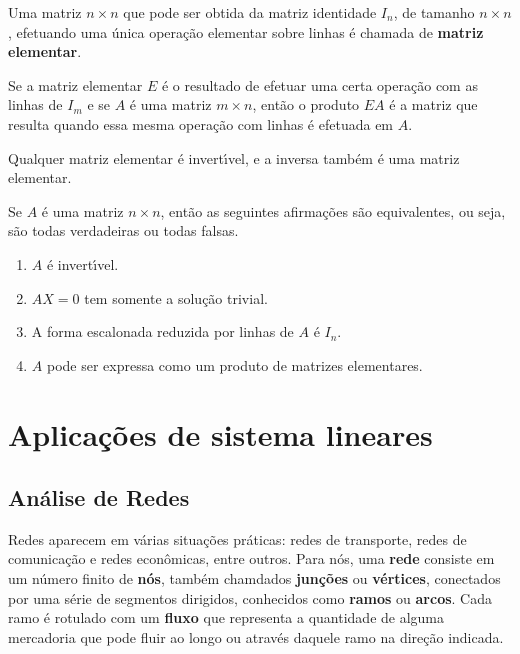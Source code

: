 \begin{definicao}
    Uma matriz $n\times n$ que pode ser obtida da matriz identidade $I_n$, de tamanho $n\times n$, efetuando uma 
    \'unica opera\c{c}\~ao elementar sobre linhas \'e chamada de \textbf{matriz elementar}.
\end{definicao}

\begin{teorema}
    Se a matriz elementar $E$ \'e o resultado de efetuar uma certa opera\c{c}\~ao com as linhas de $I_m$ e se $A$ \'e uma matriz 
    $m \times n$, ent\~ao o produto $EA$ \'e a matriz que resulta quando essa mesma opera\c{c}\~ao com linhas \'e efetuada em $A$.
\end{teorema}

\begin{teorema}
    Qualquer matriz elementar \'e invert{\'\i}vel, e a inversa tamb\'em \'e uma matriz elementar.
\end{teorema}

\begin{teorema}
    Se $A$ \'e uma matriz $n \times n$, ent\~ao as seguintes afirma\c{c}\~oes s\~ao equivalentes, ou seja, s\~ao todas verdadeiras  
    ou todas falsas.
    \begin{enumerate}[label={\roman*})]
        \item $A$ \'e invert{\'\i}vel.
        
        \item $AX = 0$ tem somente a solu\c{c}\~ao trivial.

        \item A forma escalonada reduzida por linhas de $A$ \'e $I_n$.

        \item $A$ pode ser expressa como um produto de matrizes elementares.
    \end{enumerate}
\end{teorema}

\section{Aplicações de sistema lineares}

\subsection{Análise de Redes}

Redes aparecem em várias situações práticas: redes de transporte, redes de comunicação e redes econômicas, entre outros. Para nós, uma \textbf{rede} consiste em um número finito de \textbf{nós}, também chamdados \textbf{junções} ou \textbf{vértices}, conectados por uma série de segmentos dirigidos, conhecidos como \textbf{ramos} ou \textbf{arcos}. Cada ramo é rotulado com um \textbf{fluxo} que representa a quantidade de alguma mercadoria  que pode fluir ao longo ou através daquele ramo na direção indicada.

